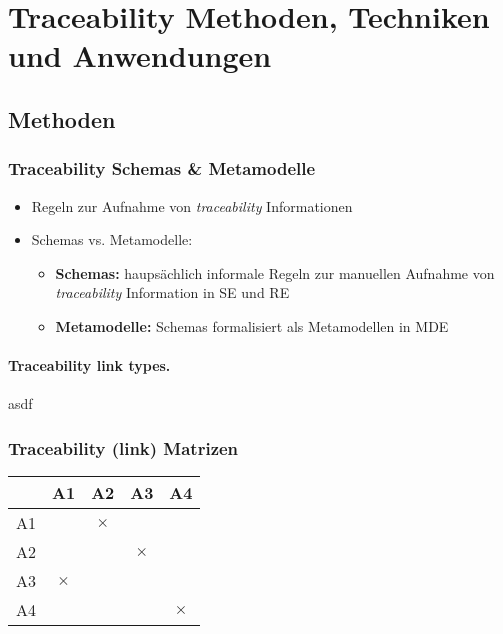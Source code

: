 \section{Traceability Methoden, Techniken und Anwendungen}
\subsection{Methoden}
\subsubsection{Traceability Schemas \& Metamodelle}
\begin{itemize}

\item
Regeln zur Aufnahme von \textit{traceability} Informationen

\item
Schemas vs. Metamodelle:
\begin{itemize}
\item
\textbf{Schemas:} haupsächlich informale Regeln zur manuellen Aufnahme von \textit{traceability} Information in SE und RE
\item
\textbf{Metamodelle:} Schemas formalisiert als Metamodellen in MDE
\end{itemize}

\end{itemize}

\paragraph{Traceability link types.}
asdf


\subsubsection{Traceability (link) Matrizen}

\begin{center}
\begin{tabular}{|c||c|c|c|c|}
\hline
& A1 & A2 & A3 &  A4 
\\\hline\hline
A1 &  & $\times$  &  &   
\\\hline
A2 &  &  & $\times$  &   
\\\hline
A3 & $\times$ &  &  &   
\\\hline
A4 &  &  &  &  $\times$
\\\hline
\end{tabular}
\end{center}

